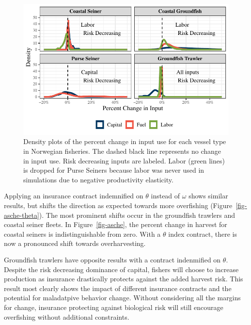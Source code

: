 \documentclass[
  letterpaper,
  DIV=11,
  numbers=noendperiod]{scrartcl}
\theoremstyle{plain}
\theoremstyle{plain}
\theoremstyle{remark}
\begin{document}
\begin{figure}

{\centering \includegraphics{ibi-behavior_files/figure-pdf/fig-asche-input-1.pdf}

}

\caption{\label{fig-asche-input}Density plots of the percent change in
input use for each vessel type in Norwegian fisheries. The dashed black
line represents no change in input use. Risk decreasing inputs are
labeled. Labor (green lines) is dropped for Purse Seiners because labor
was never used in simulations due to negative productivity elasticity.}

\end{figure}

Applying an insurance contract indemnified on \(\theta\) instead of
\(\omega\) shows similar results, but shifts the direction as expected
towards more overfishing (Figure~\ref{fig-asche-theta}). The most
prominent shifts occur in the groundfish trawlers and coastal seiner
fleets. In Figure~\ref{fig-asche}, the percent change in harvest for
coastal seiners is indistinguishable from zero. With a \(\theta\) index
contract, there is now a pronounced shift towards overharvesting.

Groundfish trawlers have opposite results with a contract indenmified on
\(\theta\). Despite the risk decreasing dominance of capital, fishers
will choose to increase production as insurance drastically protects
against the added harvest risk. This result most clearly shows the
impact of different insurance contracts and the potential for
maladatpive behavior change. Without considering all the margins for
change, insurance protecting against biological risk will still
encourage overfishing without additional constraints.
\end{document}
